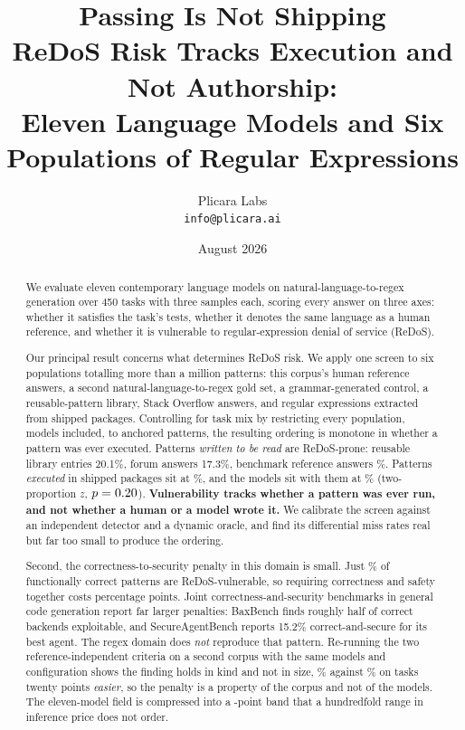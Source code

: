 \documentclass[11pt]{article}
\title{\textbf{Passing Is Not Shipping}\\[0.4em]
\large ReDoS Risk Tracks Execution and Not Authorship:\\
Eleven Language Models and Six Populations of Regular Expressions}
\author{Plicara Labs\\\texttt{info@plicara.ai}}
\date{August 2026}
\begin{document}
\maketitle

\begin{abstract}
\noindent
We evaluate eleven contemporary language models on natural-language-to-regex
generation over 450 tasks with three samples each, scoring every answer on
three axes: whether it satisfies the task's
tests, whether it denotes the same language as a human reference, and whether
it is vulnerable to regular-expression denial of service (ReDoS).

Our principal result concerns what determines ReDoS risk. We apply one screen
to six populations totalling more than a million patterns: this corpus's
human reference answers, a second natural-language-to-regex gold set, a
grammar-generated control, a reusable-pattern library, Stack Overflow answers,
and regular expressions extracted from shipped packages. Controlling for task
mix by restricting every population, models included, to anchored patterns,
the resulting ordering is monotone in whether a pattern was ever executed.
Patterns \emph{written to be read} are ReDoS-prone: reusable library entries
20.1\%, forum answers 17.3\%, benchmark reference answers \anchoredgold{}\%.
Patterns \emph{executed} in shipped packages sit at \anchoredprod{}\%, and the
models sit with them at \anchoredmodels{}\% (two-proportion $z$,
$p=0.20{}$).
\textbf{Vulnerability tracks whether a pattern was ever run, and not whether a
human or a model wrote it.} We calibrate the screen against an independent
detector and a dynamic oracle, and find its differential miss rates real but
far too small to produce the ordering.

Second, the correctness-to-security penalty in this domain is small. Just
\vulngivencorrect{}\% of functionally correct patterns are ReDoS-vulnerable, so
requiring correctness and safety together costs \safetyloss{} percentage
points. Joint correctness-and-security benchmarks in general code generation
report far larger penalties: BaxBench finds roughly half of correct backends
exploitable, and SecureAgentBench reports 15.2\% correct-and-secure for its
best agent. The regex domain does \emph{not} reproduce that pattern. Re-running the two
reference-independent criteria on a second corpus
\citep{ye2020structuredregex} with the same models and configuration shows the
finding holds in kind and not in size, \srvulngivencorrect{}\% against
\vulngivencorrect{}\% on tasks twenty points \emph{easier}, so the penalty is a
property of the corpus and not of the models. The eleven-model field is
compressed into a \bandwidth{}-point band that a hundredfold range in
inference price does not order.


\end{abstract}
\end{document}
